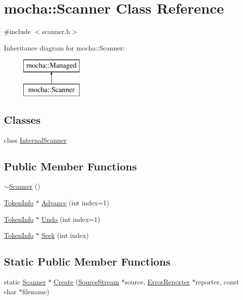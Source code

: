 \hypertarget{classmocha_1_1_scanner}{
\section{mocha::Scanner Class Reference}
\label{classmocha_1_1_scanner}
}


{\ttfamily \#include $<$scanner.h$>$}

Inheritance diagram for mocha::Scanner:\begin{figure}[H]
\begin{center}
\leavevmode
\includegraphics[height=2.000000cm]{classmocha_1_1_scanner}
\end{center}
\end{figure}
\subsection*{Classes}
\begin{DoxyCompactItemize}
\item 
class \hyperlink{classmocha_1_1_scanner_1_1_internal_scanner}{InternalScanner}
\end{DoxyCompactItemize}
\subsection*{Public Member Functions}
\begin{DoxyCompactItemize}
\item 
\hyperlink{classmocha_1_1_scanner_af9c2d1d3d0a20cf7e98cbbe53e46ce7c}{$\sim$Scanner} ()
\item 
\hyperlink{classmocha_1_1_token_info}{TokenInfo} $\ast$ \hyperlink{classmocha_1_1_scanner_acee228f06ccd3da5a2e03d4b12adcf27}{Advance} (int index=1)
\item 
\hyperlink{classmocha_1_1_token_info}{TokenInfo} $\ast$ \hyperlink{classmocha_1_1_scanner_a0545925230632e1fea9a9fcd5006baaa}{Undo} (int index=1)
\item 
\hyperlink{classmocha_1_1_token_info}{TokenInfo} $\ast$ \hyperlink{classmocha_1_1_scanner_a0b016ff6aa2f7ada851208b9f447d367}{Seek} (int index)
\end{DoxyCompactItemize}
\subsection*{Static Public Member Functions}
\begin{DoxyCompactItemize}
\item 
static \hyperlink{classmocha_1_1_scanner}{Scanner} $\ast$ \hyperlink{classmocha_1_1_scanner_ae70b34c84662cad42c7fdd3fa73f2c57}{Create} (\hyperlink{classmocha_1_1_source_stream}{SourceStream} $\ast$source, \hyperlink{classmocha_1_1_error_reporter}{ErrorReporter} $\ast$reporter, const char $\ast$filename)
\end{DoxyCompactItemize}
